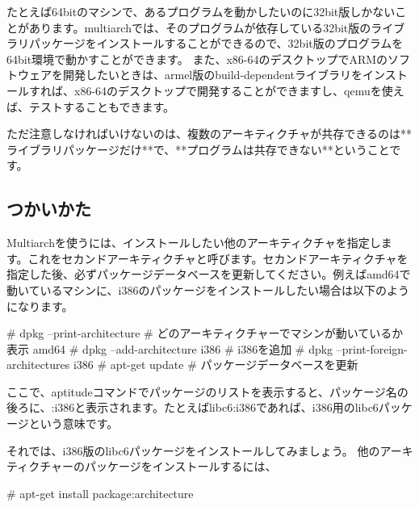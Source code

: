 \documentclass[mingoth,a4paper]{jsarticle}
\begin{document}
たとえば64bitのマシンで、あるプログラムを動かしたいのに32bit版しかないことがあります。multiarchでは、そのプログラムが依存している32bit版のライブラリパッケージをインストールすることができるので、32bit版のプログラムを64bit環境で動かすことができます。
また、x86-64のデスクトップでARMのソフトウェアを開発したいときは、armel版のbuild-dependentライブラリをインストールすれば、x86-64のデスクトップで開発することができますし、qemuを使えば、テストすることもできます。

ただ注意しなければいけないのは、複数のアーキティクチャが共存できるのは**ライブラリパッケージだけ**で、**プログラムは共存できない**ということです。




\subsection{つかいかた}
Multiarchを使うには、インストールしたい他のアーキティクチャを指定します。これをセカンドアーキティクチャと呼びます。セカンドアーキティクチャを指定した後、必ずパッケージデータベースを更新してください。例えばamd64で動いているマシンに、i386のパッケージをインストールしたい場合は以下のようになります。

\begin{commandline}
# dpkg --print-architecture  # どのアーキティクチャーでマシンが動いているか表示
amd64
# dpkg --add-architecture i386 # i386を追加
# dpkg --print-foreign-architectures
i386
# apt-get update # パッケージデータベースを更新
\end{commandline}

ここで、aptitudeコマンドでパッケージのリストを表示すると、パッケージ名の後ろに、:i386と表示されます。たとえばlibc6:i386であれば、i386用のlibc6パッケージという意味です。


それでは、i386版のlibc6パッケージをインストールしてみましょう。
他のアーキティクチャーのパッケージをインストールするには、
\begin{commandline}
# apt-get install package:architecture
\end{commandline}
\end{document}
